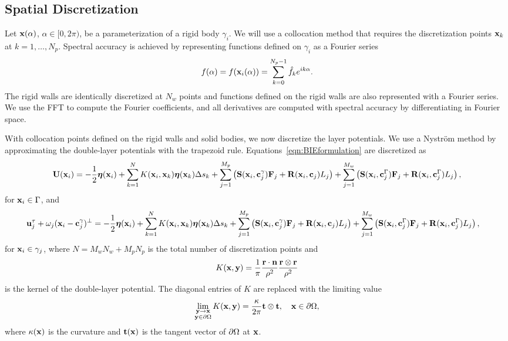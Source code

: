 \documentclass[AMA,STIX1COL]{WileyNJD-v2}
\begin{document}
\subsection{Spatial Discretization}\label{sec:spatial}
Let ${\mathbf{x}}(\alpha)$, $\alpha \in [0,2\pi)$, be a parameterization of a
rigid body $\gamma_i$.  We will use a collocation method that requires
the discretization points ${\mathbf{x}}_k$ at $k=1,\ldots,N_p$.  Spectral
accuracy is achieved by representing functions defined on $\gamma_i$ as
a Fourier series
\begin{align}
  f(\alpha) = f({\mathbf{x}}_i(\alpha)) = 
    \sum_{k = 0}^{N_p-1} \hat{f}_k e^{ik\alpha}.
\end{align}
The rigid walls are identically discretized at $N_w$ points and
functions defined on the rigid walls are also represented with a Fourier
series.  We use the FFT to compute the Fourier coefficients, and all
derivatives are computed with spectral accuracy by differentiating in
Fourier space.

With collocation points defined on the rigid walls and solid bodies, we
now discretize the layer potentials.  We use a Nystr\"om method by
approximating the double-layer potentials with the trapezoid rule.
Equations~\eqref{eqn:BIEformulation} are discretized as
\begin{equation*}
  \begin{aligned}
  {\mathbf{U}}({\mathbf{x}}_i) = -\frac{1}{2}{\boldsymbol\eta}({\mathbf{x}}_i) + 
  \sum_{k=1}^{N} K({\mathbf{x}}_i,{\mathbf{x}}_k) {\boldsymbol\eta}({\mathbf{x}}_k) \Delta s_k
    + \sum_{j=1}^{M_p} \left(\mathbf{S}({\mathbf{x}}_i,{\mathbf{c}}^\gamma_j){\mathbf{F}}_j +
    \mathbf{R}({\mathbf{x}}_i,{\mathbf{c}}_j)L_j\right) 
    + \sum_{j=1}^{M_w} \left(\mathbf{S}({\mathbf{x}}_i,{\mathbf{c}}^\Gamma_j){\mathbf{F}}_j +
    \mathbf{R}({\mathbf{x}}_i,{\mathbf{c}}^\Gamma_j)L_j\right),
  \end{aligned}
\end{equation*}
for ${\mathbf{x}}_i \in \Gamma$, and
\begin{equation*}
  \begin{aligned}
{\mathbf{u}}^\tau_j + \omega_j({\mathbf{x}}_i - {\mathbf{c}}^\gamma_j)^\perp =
-\frac{1}{2}{\boldsymbol\eta}({\mathbf{x}}_i) +
\sum_{k=1}^{N} K({\mathbf{x}}_i,{\mathbf{x}}_k) {\boldsymbol\eta}({\mathbf{x}}_k) \Delta s_k
    &+ \sum_{j=1}^{M_p} \left(\mathbf{S}({\mathbf{x}}_i,{\mathbf{c}}^\gamma_j){\mathbf{F}}_j +
    \mathbf{R}({\mathbf{x}}_i,{\mathbf{c}}_j)L_j\right) 
    + \sum_{j=1}^{M_w} \left(\mathbf{S}({\mathbf{x}}_i,{\mathbf{c}}^\Gamma_j){\mathbf{F}}_j +
    \mathbf{R}({\mathbf{x}}_i,{\mathbf{c}}^\Gamma_j)L_j\right),
  \end{aligned}
\end{equation*}
for ${\mathbf{x}}_i \in \gamma_j$, where $N = M_w N_w + M_p N_p$ is the total
number of discretization points and
\begin{align*}
  K({\mathbf{x}},{\mathbf{y}}) = \frac{1}{\pi} \frac{{\mathbf{r}} \cdot {\mathbf{n}}}{\rho^2} 
               \frac{{\mathbf{r}} \otimes {\mathbf{r}}}{\rho^2}
\end{align*}
is the kernel of the double-layer potential.  The diagonal entries of
$K$ are replaced with the limiting value
\begin{align*}
  \lim_{\substack{{\mathbf{y}} \rightarrow {\mathbf{x}} \\ {\mathbf{y}} \in {\partial}\Omega}} 
    K({\mathbf{x}},{\mathbf{y}}) = \frac{\kappa}{2\pi}{\mathbf{t}}\otimes{\mathbf{t}},
    \quad {\mathbf{x}} \in {\partial}\Omega,
\end{align*}
where $\kappa({\mathbf{x}})$ is the curvature and ${\mathbf{t}}({\mathbf{x}})$ is the tangent
vector of ${\partial}\Omega$ at ${\mathbf{x}}$.
\end{document}
